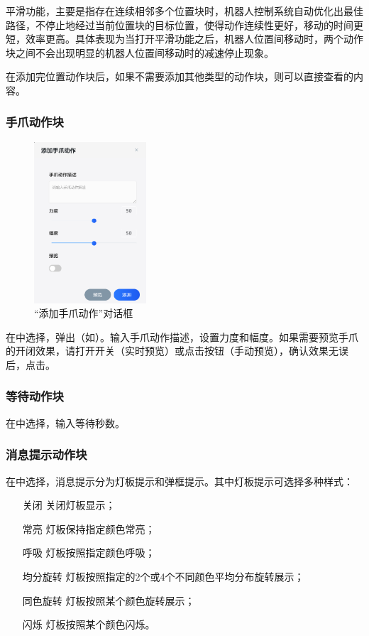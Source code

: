 平滑功能，主要是指存在连续相邻多个位置块时，机器人控制系统自动优化出最佳路径，不停止地经过当前位置块的目标位置，使得动作连续性更好，移动的时间更短，效率更高。具体表现为当打开平滑功能之后，机器人位置间移动时，两个动作块之间不会出现明显的机器人位置间移动时的减速停止现象。

在添加完位置动作块后，如果不需要添加其他类型的动作块，则可以直接查看的内容。

\subsubsection{手爪动作块}

\begin{figure}[htb]
	\centering
	\includegraphics[height=6cm]{screen/3-12.png}
	\caption{“添加手爪动作”对话框}
	\label{fig:添加手爪动作对话框}
\end{figure}

在中选择，弹出（如）。输入手爪动作描述，设置力度和幅度。如果需要预览手爪的开闭效果，请打开开关（实时预览）或点击按钮（手动预览），确认效果无误后，点击。

\subsubsection{等待动作块}
在中选择，输入等待秒数。
\subsubsection{消息提示动作块}
在中选择，消息提示分为灯板提示和弹框提示。其中灯板提示可选择多种样式：
\begin{itemize}[leftmargin=4.5em]
\item[关闭] 关闭灯板显示；
\item[常亮] 灯板保持指定颜色常亮；
\item[呼吸] 灯板按照指定颜色呼吸；
\item[均分旋转] 灯板按照指定的2个或4个不同颜色平均分布旋转展示；
\item[同色旋转] 灯板按照某个颜色旋转展示；
\item[闪烁] 灯板按照某个颜色闪烁。
\end{itemize}
